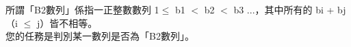 所謂「B2數列」係指一正整數數列 1$\leq$ b1 $<$ b2 $<$ b3 ...，其中所有的 bi + bj （i $\leq$ j）皆不相等。\\
您的任務是判別某一數列是否為「B2數列」。\\
